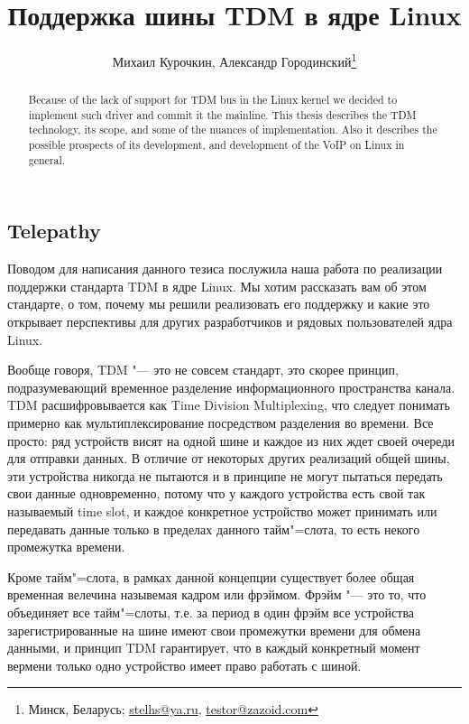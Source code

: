 \documentclass[10pt, a5paper]{article}
\begin{document}
\title{Поддержка шины TDM в ядре Linux}%

\author{Михаил Курочкин, Александр Городинский\footnote{Минск, Беларусь; \url{stelhs@ya.ru}, \url{testor@zazoid.com}}}
\maketitle

\begin{abstract}
Because of the lack of support for TDM bus in the Linux kernel we decided to implement such driver and commit it the mainline. This thesis describes the TDM technology, its scope, and some of the nuances of implementation. Also it describes the possible prospects of its development, and development of the VoIP on Linux in general.
\end{abstract}

\subsection*{Telepathy}

Поводом для написания данного тезиса послужила наша работа по реализации
поддержки стандарта TDM в ядре Linux. Мы хотим рассказать вам об этом
стандарте, о том, почему мы решили реализовать его поддержку и какие это
открывает перспективы для других разработчиков и рядовых пользователей
ядра Linux.

Вообще говоря, TDM "--- это не совсем стандарт, это скорее принцип,
подразумевающий временное разделение информационного пространства канала.
TDM расшифровывается как Time Division \linebreak Multiplexing, что следует понимать
примерно как мультиплексирование посредством разделения во времени. Все
просто: ряд устройств висят на одной шине и каждое из них ждет своей
очереди для отправки данных. В отличие от некоторых других реализаций
общей шины, эти устройства никогда не пытаются и в принципе не могут
пытаться передать свои данные одновременно, потому что у каждого
устройства есть свой так называемый time slot, и каждое конкретное
устройство может принимать или передавать данные только в пределах данного
тайм"=слота, то есть некого промежутка времени.

Кроме тайм"=слота, в рамках данной концепции существует более общая
временная велечина назывемая кадром или фрэймом. Фрэйм "--- это то, что
объединяет все тайм"=слоты, т.е. за период в один фрэйм все устройства
зарегистрированные на шине имеют свои промежутки времени для обмена
данными, и принцип TDM гарантирует, что в каждый конкретный момент вермени
только одно устройство имеет право работать с шиной.
\end{document}
